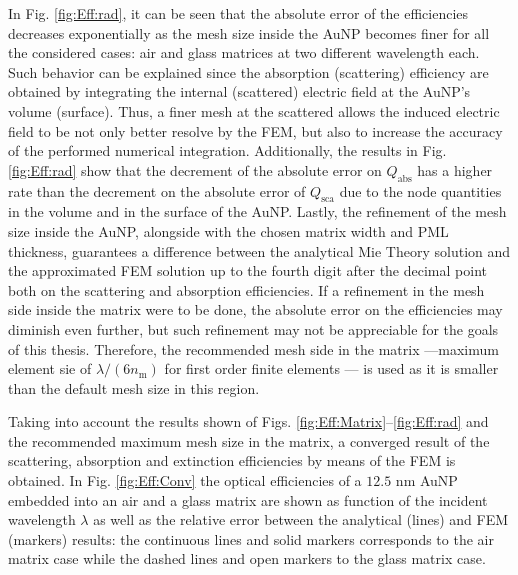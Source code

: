 In Fig. \ref{fig:Eff:rad}, it can be seen that the absolute error of the efficiencies decreases exponentially as the mesh size inside the AuNP becomes finer for all the considered cases: air and glass matrices at two different wavelength each. Such behavior can be explained since the absorption (scattering) efficiency are obtained by integrating the internal (scattered) electric field at the AuNP's volume (surface). Thus, a finer mesh at the scattered allows the induced electric field to be not only better resolve by the FEM, but also to increase the accuracy of the performed numerical integration. Additionally,  the results in Fig. \ref{fig:Eff:rad} show that the decrement of the absolute error on $Q_\text{abs}$ has a higher rate than the decrement on the absolute error of $Q_\text{sca}$ due to the node quantities in the volume and in the surface of the AuNP. Lastly, the refinement of the mesh size inside the AuNP, alongside with the chosen matrix width and PML thickness, guarantees a difference between the analytical Mie Theory solution and the approximated FEM solution up to the fourth digit after the decimal point both on the scattering and absorption efficiencies. If a refinement in the mesh side inside the matrix were to be done, the absolute error on the efficiencies may diminish even further, but such refinement may not be appreciable for the goals of this thesis. Therefore, the recommended mesh side in the matrix ---maximum element sie of $\lambda/(6n_\text{m})$ for first order finite elements \cite{comsol_doc}--- is used as it is smaller than the default mesh size in this region.

Taking into account the results shown of Figs. \ref{fig:Eff:Matrix}--\ref{fig:Eff:rad} and the recommended maximum mesh size in the matrix, a converged result of the scattering, absorption and extinction efficiencies by means of the FEM is obtained. In Fig. \ref{fig:Eff:Conv} the optical efficiencies of a $12.5$ nm AuNP embedded into an air and a glass matrix are shown as function of the incident wavelength $\lambda$ as well as the relative error between the analytical (lines) and FEM (markers) results: the continuous lines and solid markers corresponds to the air matrix case while  the dashed lines and open markers to the glass matrix case.

